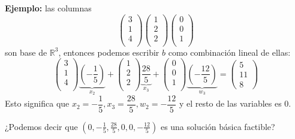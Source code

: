 \documentclass[10pt, aspectratio=169]{beamer}
\begin{document}
    \begin{frame}
        \textbf{Ejemplo:} las columnas
        \[
        \begin{pmatrix}
            3 \\
            1 \\
            4 \\
        \end{pmatrix}
        \begin{pmatrix}
            1 \\
            2 \\
            2 \\
        \end{pmatrix}
        \begin{pmatrix}
            0 \\
            0 \\
            1 \\
        \end{pmatrix}
        \]
        son base de $\mathbb{R}^3$, entonces podemos escribir $b$ como combinación lineal de ellas:
        \pause
        \[
        \begin{pmatrix}
            3 \\
            1 \\
            4 \\
        \end{pmatrix} \underbrace{\left(-\dfrac{1}{5}\right)}_{x_2} +
        \begin{pmatrix}
            1 \\
            2 \\
            2 \\
        \end{pmatrix} \underbrace{\dfrac{28}{5}}_{x_3} +
        \begin{pmatrix}
            0 \\
            0 \\
            1 \\
        \end{pmatrix} \underbrace{\left(-\dfrac{12}{5}\right)}_{w_3} =
        \begin{pmatrix}
                5 \\
                11 \\
                8
        \end{pmatrix}
        \]
        Esto significa que $x_2=-\dfrac{1}{5},x_3=\dfrac{28}{5},w_2=-\dfrac{12}{5}$ y el resto de las variables es $0$.

        ¿Podemos decir que $(0,-\frac{1}{5},\frac{28}{5},0,0,-\frac{12}{5})$ es una solución básica factible?
    \end{frame}
\end{document}

